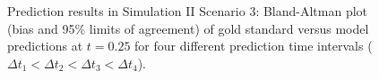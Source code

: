 \documentclass[12pt]{article}
\begin{document}
\begin{figure}[H]
\centering
{}
{}
  \caption{Prediction results in Simulation II Scenario 3: Bland-Altman plot (bias and 95\% limits of agreement) of gold standard versus model predictions at $t=0.25$ for four different prediction time intervals ($\Delta t_1 < \Delta t_2 < \Delta t_3 < \Delta t_4$).}
  \label{plot:sim2fig2}
\end{figure}


\newpage
\end{document}

